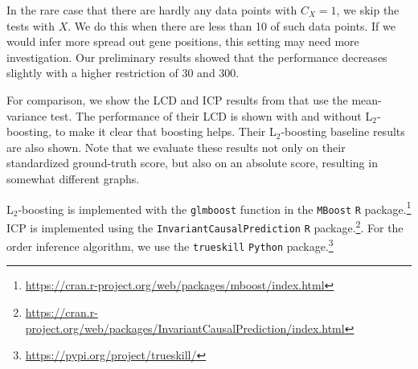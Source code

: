 In the rare case that there are hardly any data points with $C_X=1$, we skip the tests with $X$. We do this when there are less than 10 of such data points. If we would infer more spread out gene positions, this setting may need more investigation. Our preliminary results showed that the performance decreases slightly with a higher restriction of 30 and 300.

For comparison, we show the LCD and ICP results from \citet{versteeg2019boosting} that use the mean-variance test. The performance of their LCD is shown with and without L$_2$-boosting, to make it clear that boosting helps. Their L$_2$-boosting baseline results are also shown. Note that we evaluate these results not only on their standardized ground-truth score, but also on an absolute score, resulting in somewhat different graphs.

L$_2$-boosting is implemented with the \texttt{glmboost} function in the \texttt{MBoost} \texttt{R} package.\footnote{\href{https://cran.r-project.org/web/packages/mboost/index.html}{https://cran.r-project.org/web/packages/mboost/index.html}} ICP is implemented using the \texttt{InvariantCausalPrediction} \texttt{R} package.\footnote{\href{https://cran.r-project.org/web/packages/InvariantCausalPrediction/index.html}{https://cran.r-project.org/web/packages/InvariantCausalPrediction/index.html}}. For the order inference algorithm, we use the \texttt{trueskill} \texttt{Python} package.\footnote{\href{https://pypi.org/project/trueskill/}{https://pypi.org/project/trueskill/}}